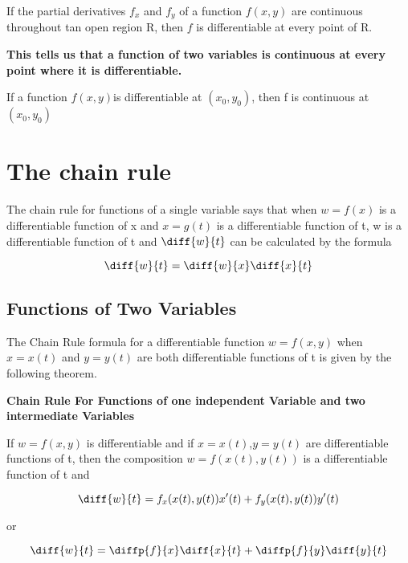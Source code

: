 \documentclass[12pt,a4paper]{article}
\newenvironment{theorem}{\begin{theorembox}}{\end{theorembox}\vspace{1\baselineskip}}
\newenvironment{corollary}{\begin{corollarybox}}{\end{corollarybox}\vspace{1\baselineskip}}
\newcommand{\fxy}{\(f(x,y)\)}
\begin{document}
\begin{corollary}
    If the partial derivatives \(f_x\) and \(f_y\) of a function \(f(x,y)\) are continuous throughout tan open region R, then \(f\) is differentiable at every point of R. 

\end{corollary}


\textbf{This tells us that a function of two variables is continuous at every point where it is differentiable.
}


\begin{theorem}
    If a function \fxy is differentiable at \((x_0,y_0)\), then f is continuous at \((x_0,y_0)\)
\end{theorem}

\newpage

\section{The chain rule}

The chain rule for functions of a single variable says that when \(w = f(x)\) is a differentiable function of x and \(x= g(t)\) is a differentiable function of t, w is a differentiable function of t and \(\diff{w}{t}\) can be calculated by the formula

\[\diff{w}{t} = \diff{w}{x}\diff{x}{t}\]


\subsection{Functions of Two Variables}

The Chain Rule formula for a differentiable function \(w= f(x,y)\) when \(x = x(t)\) and \(y = y(t)\) are both differentiable functions of t is given by the following theorem.

\begin{theorem}
\textbf{Chain Rule For Functions of one independent Variable and two intermediate Variables}

If \(w = f(x,y)\) is differentiable and if \(x = x(t)\),\(y = y(t)\) are differentiable functions of t, then the composition \(w = f(x(t),y(t))\) is a differentiable function of t and 

\[\diff{w}{t} = f_x(x(t),y(t))x'(t) + f_y(x(t), y(t))y'(t)\]

or

\[\diff{w}{t} = \diffp{f}{x}\diff{x}{t} + \diffp{f}{y}\diff{y}{t}\]


\end{theorem}
\end{document}

